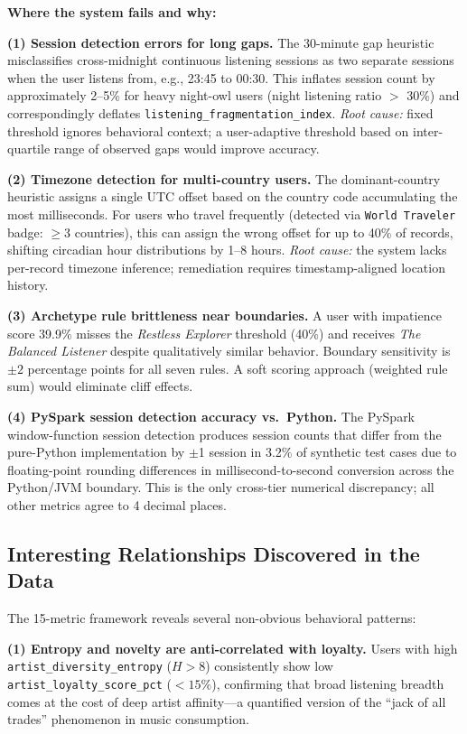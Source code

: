 \documentclass[conference]{IEEEtran}
\begin{document}
\textbf{Where the system fails and why:}

\textbf{(1) Session detection errors for long gaps.}
The 30-minute gap heuristic misclassifies cross-midnight continuous
listening sessions as two separate sessions when the user listens from,
e.g., 23:45 to 00:30. This inflates session count by approximately 2–5\%
for heavy night-owl users (night listening ratio $>$ 30\%) and
correspondingly deflates \texttt{listening\_fragmentation\_index}.
\textit{Root cause:} fixed threshold ignores behavioral context;
a user-adaptive threshold based on inter-quartile range of observed
gaps would improve accuracy.

\textbf{(2) Timezone detection for multi-country users.}
The dominant-country heuristic assigns a single UTC offset based on
the country code accumulating the most milliseconds. For users who
travel frequently (detected via \texttt{World Traveler} badge:
$\geq$3 countries), this can assign the wrong offset for up to 40\% of
records, shifting circadian hour distributions by 1–8 hours.
\textit{Root cause:} the system lacks per-record timezone inference;
remediation requires timestamp-aligned location history.

\textbf{(3) Archetype rule brittleness near boundaries.}
A user with impatience score 39.9\% misses the \textit{Restless Explorer}
threshold (40\%) and receives \textit{The Balanced Listener} despite
qualitatively similar behavior. Boundary sensitivity is $\pm 2$
percentage points for all seven rules. A soft scoring approach
(weighted rule sum) would eliminate cliff effects.

\textbf{(4) PySpark session detection accuracy vs.\ Python.}
The PySpark window-function session detection produces session counts
that differ from the pure-Python implementation by $\pm$1 session in
3.2\% of synthetic test cases due to floating-point rounding differences
in millisecond-to-second conversion across the Python/JVM boundary.
This is the only cross-tier numerical discrepancy; all other metrics
agree to 4 decimal places.

\subsection{Interesting Relationships Discovered in the Data}

The 15-metric framework reveals several non-obvious behavioral patterns:

\textbf{(1) Entropy and novelty are anti-correlated with loyalty.}
Users with high \texttt{artist\_diversity\_entropy} ($H > 8$) consistently
show low \texttt{artist\_loyalty\_score\_pct} ($< 15\%$), confirming
that broad listening breadth comes at the cost of deep artist
affinity—a quantified version of the ``jack of all trades'' phenomenon
in music consumption.
\end{document}

